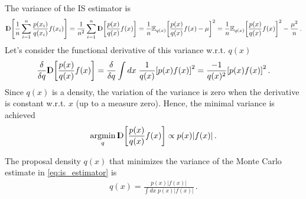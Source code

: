 The variance of the IS estimator is
\begin{align}
    \var\left[\frac{1}{n}\sum_{i=1}^n\frac{p(x_i)}{q(x_i)}f(x_i)\right] = \frac{1}{n^2}\sum_{i=1}^n\var\left[\frac{p(x)}{q(x)} f(x)\right] = \frac{1}{n}\mean_{q(x)}\left[\frac{p(x)}{q(x)} f(x) - \mu\right]^2 = \frac{1}{n}\mean_{q(x)}\left[\frac{p(x)}{q(x)} f(x)\right]^2 - \frac{\mu^2}{n}\,.
\end{align}
Let's consider the functional derivative of this variance w.r.t. $q(x)$
\begin{align}
    \frac{\delta }{\delta q}\var\left[\frac{p(x)}{q(x)} f(x)\right] = \frac{\delta }{\delta q} \int dx\; \frac{1}{q(x)}\left[p(x)f(x)\right]^2 = \frac{-1}{q(x)^2}\left[p(x)f(x)\right]^2\,.
\end{align}
Since $q(x)$ is a density, the variation of the variance is zero when the derivative is constant w.r.t. $x$ (up to a measure zero).
Hence, the minimal variance is achieved
\begin{align}
    \argmin_{q}\var\left[\frac{p(x)}{q(x)} f(x)\right] \propto p(x)|f(x)|\,.
\end{align}

\begin{proposition}
    The proposal density $q(x)$ that minimizes the variance of the Monte Carlo estimate in \cref{eq:is_estimator} is
    \begin{align}
        q(x) = \frac{p(x)|f(x)|}{\int dx\;p(x)|f(x)|}\,.
    \end{align}
\end{proposition}

